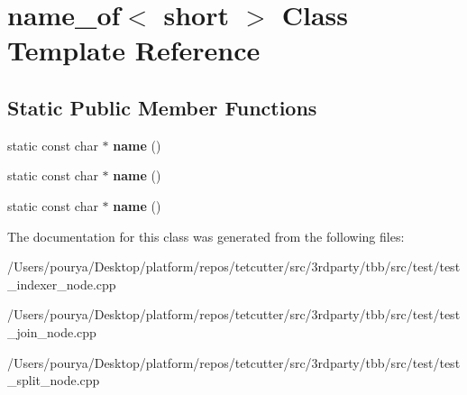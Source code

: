 \hypertarget{classname__of_3_01short_01_4}{}\section{name\+\_\+of$<$ short $>$ Class Template Reference}
\label{classname__of_3_01short_01_4}
\subsection*{Static Public Member Functions}
\begin{DoxyCompactItemize}
\item 
\hypertarget{classname__of_3_01short_01_4_a1d441abad818f8de26f1a6c566aa538e}{}static const char $\ast$ {\bfseries name} ()\label{classname__of_3_01short_01_4_a1d441abad818f8de26f1a6c566aa538e}

\item 
\hypertarget{classname__of_3_01short_01_4_a1d441abad818f8de26f1a6c566aa538e}{}static const char $\ast$ {\bfseries name} ()\label{classname__of_3_01short_01_4_a1d441abad818f8de26f1a6c566aa538e}

\item 
\hypertarget{classname__of_3_01short_01_4_a1d441abad818f8de26f1a6c566aa538e}{}static const char $\ast$ {\bfseries name} ()\label{classname__of_3_01short_01_4_a1d441abad818f8de26f1a6c566aa538e}

\end{DoxyCompactItemize}


The documentation for this class was generated from the following files\+:\begin{DoxyCompactItemize}
\item 
/\+Users/pourya/\+Desktop/platform/repos/tetcutter/src/3rdparty/tbb/src/test/test\+\_\+indexer\+\_\+node.\+cpp\item 
/\+Users/pourya/\+Desktop/platform/repos/tetcutter/src/3rdparty/tbb/src/test/test\+\_\+join\+\_\+node.\+cpp\item 
/\+Users/pourya/\+Desktop/platform/repos/tetcutter/src/3rdparty/tbb/src/test/test\+\_\+split\+\_\+node.\+cpp\end{DoxyCompactItemize}
